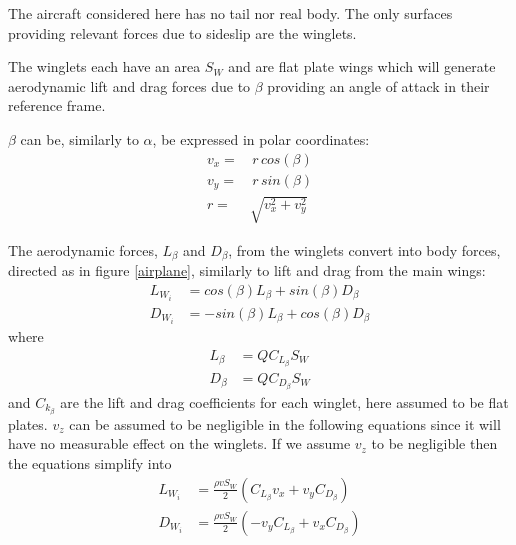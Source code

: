 The aircraft considered here has no tail nor real body.
The only surfaces providing relevant forces due to sideslip are the winglets.

The winglets each have an area $S_W$ and are flat plate wings which will generate aerodynamic lift and drag forces due to $\beta$ providing an angle of attack in their reference frame.

$\beta$ can be, similarly to $\alpha$, be expressed in polar coordinates:
\begin{equation}\begin{split}
    v_x =& \, r \, cos(\beta) \\
    v_y =& \, r \, sin(\beta) \\
    r =& \sqrt{v_x^2 + v_y^2}
\end{split}\end{equation}



The aerodynamic forces, $L_\beta$ and $D_\beta$, from the winglets convert into body forces, directed as in figure \ref{airplane}, similarly to lift and drag from the main wings:
\begin{equation}\begin{split}
L_{W_i} &= cos(\beta) L_\beta +  sin(\beta)D_\beta \\
D_{W_i} & = -sin(\beta) L_\beta + cos(\beta) D_\beta
\end{split}\end{equation}
where
\begin{equation}\begin{split}
L_\beta &= Q C_{L_\beta} S_W \\
D_\beta & = Q C_{D_\beta} S_W
\end{split}\end{equation}
and $C_{k_\beta}$ are the lift and drag coefficients for each winglet, here assumed to be flat plates.
$v_z$ can be assumed to be negligible in the following equations since it will have no measurable effect on the winglets.
If we assume $v_z$ to be negligible then the equations simplify into
\begin{equation}\begin{split}
L_{W_i} &= 
    \frac{\rho v S_W}{2}  \left( C_{L_\beta} v_x + v_y C_{D_\beta} \right) \\
%
D_{W_i} &= 
    \frac{\rho v S_W}{2 }  \left(-v_y C_{L_\beta} + v_x C_{D_\beta} \right)
\end{split}\end{equation}

